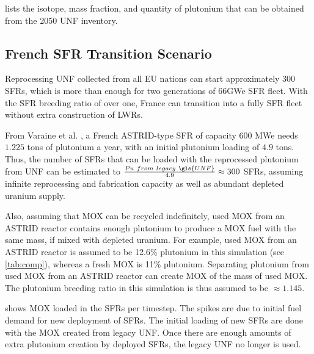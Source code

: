  lists the isotope, mass fraction,
and quantity of plutonium that can be obtained from the 2050 \gls{UNF} inventory.


\subsection{French \gls{SFR} Transition Scenario}

Reprocessing \gls{UNF} collected from all EU nations can start approximately
300 \glspl{SFR}, which is more than enough for two generations of 66GWe \gls{SFR}
fleet. With the \gls{SFR} breeding ratio of over one, France can transition into
a fully \gls{SFR} fleet without extra construction of \glspl{LWR}. 

From Varaine et al. \cite{marsaultmarie-sophie_pre-conceptual_2012}, a French
ASTRID-type \gls{SFR} of capacity 600 MWe needs $1.225$ tons of
plutonium a year, with an initial plutonium loading of $4.9$ tons. 
Thus, the number of \glspl{SFR} that can be loaded with the reprocessed
plutonium from \gls{UNF} can be estimated to $\frac{Pu \ from \ legacy \ \gls{UNF}}{4.9} \approx 300$ \glspl{SFR},
assuming infinite reprocessing and fabrication capacity as well as
abundant depleted uranium supply. 

Also, assuming that \gls{MOX} can be recycled indefinitely,
used \gls{MOX} from an ASTRID reactor
contains enough plutonium to produce a \gls{MOX} fuel with
the same mass, if mixed with depleted uranium. For example,
used \gls{MOX} from an ASTRID reactor is assumed to be 12.6\% plutonium
in this simulation (see \cref{tab:comp}), whereas a fresh \gls{MOX} is 11\% plutonium.
Separating plutonium from used \gls{MOX} from
an ASTRID reactor can create \gls{MOX} of the mass of used \gls{MOX}.
The plutonium breeding ratio in this simulation is thus assumed to be
$\approx 1.145$.

 shows \gls{MOX} loaded in the \glspl{SFR} per timestep.
The spikes are due to initial fuel demand for new deployment of \glspl{SFR}.
The initial loading of new \glspl{SFR} are done with the \gls{MOX} created
from legacy \gls{UNF}. Once there are enough amounts of extra plutonium creation
by deployed \glspl{SFR}, the legacy \gls{UNF} no longer is used. 

